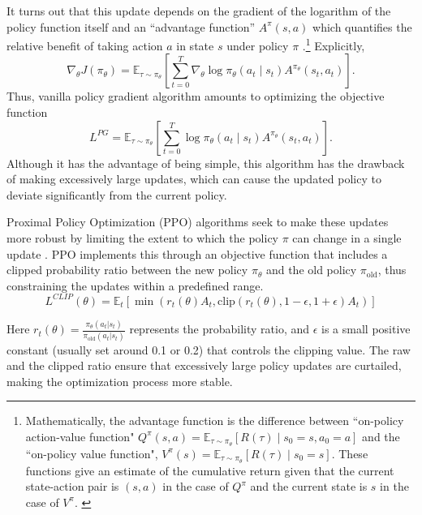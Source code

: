 It turns out that this update depends on the gradient of the logarithm of the policy function itself and an ``advantage function'' \( A^\pi (s, a) \) which quantifies the relative benefit of taking action \( a \) in state \( s \) under policy \( \pi \) \cite{SpinningUp2018}.\footnote{
Mathematically, the advantage function is the difference between ``on-policy action-value function" $Q^{\pi}(s, a) = \mathbb{E}_{\tau \sim \pi_\theta} [R(\tau) \mid s_0 = s, a_0 = a]$ and the ``on-policy value function", $V^{\pi}(s) = \mathbb{E}_{\tau \sim \pi_\theta} [R(\tau) \mid s_0 = s]$.
These functions give an estimate of the cumulative return given that the current state-action pair is $(s, a)$ in the case of $Q^\pi$ and the current state is $s$ in the case of $V^{\pi}$.
\label{ft:advantage}}
Explicitly,
\[
\nabla_\theta J(\pi_\theta) =
\mathbb{E}_{\tau \sim \pi_\theta} \left[ \sum\limits_{t=0}^T \nabla_\theta \log \pi_\theta (a_t \mid s_t) A^{\pi_\theta} (s_t, a_t) \right].
\]
Thus, vanilla policy gradient algorithm amounts to optimizing the objective function
\[
L^{PG} = \mathbb{E}_{\tau \sim \pi_\theta} \left[ \sum\limits_{t=0}^T \log \pi_\theta (a_t \mid s_t) A^{\pi_\theta} (s_t, a_t) \right].
\]
Although it has the advantage of being simple, this algorithm has the drawback of making excessively large updates, which can cause the updated policy to deviate significantly from the current policy.

Proximal Policy Optimization (PPO) algorithms seek to make these updates more robust by limiting the extent to which the policy \( \pi \) can change in a single update \cite{schulman2017proximal}.
PPO implements this through an objective function that includes a clipped probability ratio between the new policy \( \pi_\theta \) and the old policy \( \pi_{\text{old}} \), thus constraining the updates within a predefined range.
\[
L^{CLIP}(\theta) = \mathbb{E}_{t} \left[ \min(r_t(\theta) A_t, \text{clip}(r_t(\theta), 1 - \epsilon, 1 + \epsilon) A_t) \right]
\]

Here \( r_t(\theta) = \frac{\pi_\theta(a_t | s_t)}{\pi_{\text{old}}(a_t | s_t)} \) represents the probability ratio, and \( \epsilon \) is a small positive constant (usually set around 0.1 or 0.2) that controls the clipping value.
The raw and the clipped ratio ensure that excessively large policy updates are curtailed, making the optimization process more stable.

